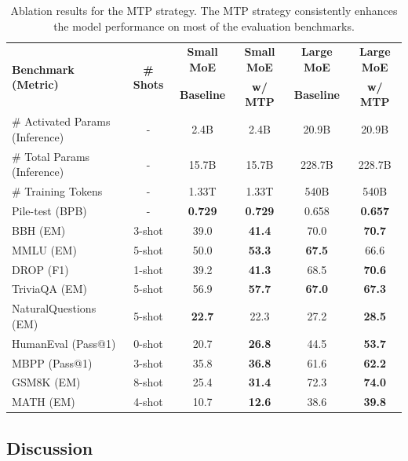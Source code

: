 \documentclass[11pt, a4paper, logo, copyright, nonumbering]{deepseek}
\begin{document}
\begin{CJK*}{UTF8}{gbsn}
\begin{table}[h]
    \centering
    \footnotesize
    \setlength{\tabcolsep}{8pt}
    \begin{tabular}{@{}l c | c c | c c@{}}
    \toprule
    \multirow{2}{*}{\centering \textbf{Benchmark (Metric)}} & \multirow{2}{*}{\textbf{\# Shots}} & \textbf{Small MoE} & \textbf{Small MoE} & \textbf{Large MoE} & \textbf{Large MoE} \\
     & & \textbf{Baseline} & \textbf{w/ MTP} & \textbf{Baseline} & \textbf{w/ MTP} \\
    \midrule
    \# Activated Params {\tiny (Inference)} & - & 2.4B & 2.4B & 20.9B & 20.9B \\
    \# Total Params {\tiny (Inference)} & - & 15.7B & 15.7B & 228.7B & 228.7B \\
    \# Training Tokens & - & 1.33T & 1.33T & 540B & 540B \\
    \midrule
    Pile-test {\tiny (BPB)} & - & \textbf{0.729} & \textbf{0.729} & 0.658 & \textbf{0.657} \\
    BBH {\tiny (EM)} & 3-shot & 39.0 & \textbf{41.4} & 70.0 & \textbf{70.7} \\
    MMLU {\tiny (EM)} & 5-shot & 50.0 & \textbf{53.3} & \textbf{67.5} & 66.6 \\
    DROP {\tiny (F1)} & 1-shot & 39.2 & \textbf{41.3} & 68.5 & \textbf{70.6} \\
    TriviaQA {\tiny (EM)} & 5-shot & 56.9 & \textbf{57.7} & \textbf{67.0} & \textbf{67.3} \\
    NaturalQuestions {\tiny (EM)} & 5-shot & \textbf{22.7} & 22.3 & 27.2 & \textbf{28.5} \\
    HumanEval {\tiny (Pass@1)} & 0-shot & 20.7 & \textbf{26.8} & 44.5 & \textbf{53.7} \\
    MBPP {\tiny (Pass@1)} & 3-shot & 35.8 & \textbf{36.8} & 61.6 & \textbf{62.2} \\
    GSM8K {\tiny (EM)} & 8-shot & 25.4 & \textbf{31.4} & 72.3 & \textbf{74.0} \\
    MATH {\tiny (EM)} & 4-shot & 10.7 & \textbf{12.6} & 38.6 & \textbf{39.8} \\
    \bottomrule
    \end{tabular}
    \caption{
    Ablation results for the MTP strategy. 
    The MTP strategy consistently enhances the model performance on most of the evaluation benchmarks.
    }
    \label{tab:ablation_nextn}
\end{table}

\subsection{Discussion}


\end{CJK*}
\end{document}
